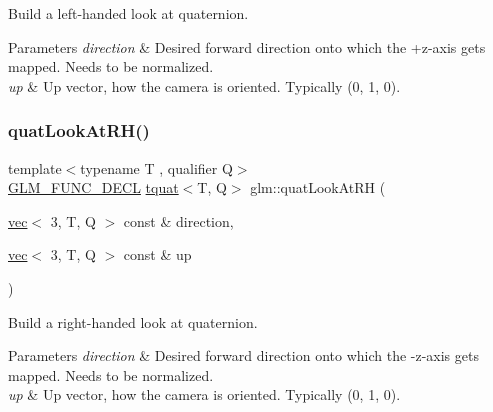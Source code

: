 Build a left-\/handed look at quaternion.


\begin{DoxyParams}{Parameters}
{\em direction} & Desired forward direction onto which the +z-\/axis gets mapped. Needs to be normalized. \\
\hline
{\em up} & Up vector, how the camera is oriented. Typically (0, 1, 0). \\
\hline
\end{DoxyParams}
\mbox{\label{group__gtx__quaternion_gad30cbeb78315773b6d18d9d1c1c75b77}} 
\subsubsection{\texorpdfstring{quat\+Look\+At\+R\+H()}{quatLookAtRH()}}
{\footnotesize\ttfamily template$<$typename T , qualifier Q$>$ \\
\hyperlink{setup_8hpp_ab2d052de21a70539923e9bcbf6e83a51}{G\+L\+M\+\_\+\+F\+U\+N\+C\+\_\+\+D\+E\+CL} \hyperlink{structglm_1_1tquat}{tquat}$<$T, Q$>$ glm\+::quat\+Look\+At\+RH (\begin{DoxyParamCaption}\item[{\hyperlink{structglm_1_1vec}{vec}$<$ 3, T, Q $>$ const \&}]{direction,  }\item[{\hyperlink{structglm_1_1vec}{vec}$<$ 3, T, Q $>$ const \&}]{up }\end{DoxyParamCaption})}

Build a right-\/handed look at quaternion.


\begin{DoxyParams}{Parameters}
{\em direction} & Desired forward direction onto which the -\/z-\/axis gets mapped. Needs to be normalized. \\
\hline
{\em up} & Up vector, how the camera is oriented. Typically (0, 1, 0). \\
\hline
\end{DoxyParams}
\mbox{\label{group__gtx__quaternion_ga49730f975e7f0ee3862a20b767aba583}} 
